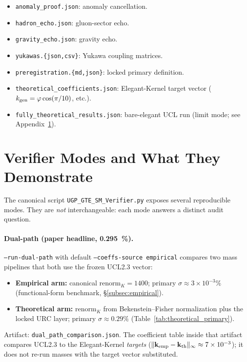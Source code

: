\documentclass[11pt]{article}
\theoremstyle{remark}
\begin{document}
\begin{appendices}
\begin{itemize}[leftmargin=1.2em,itemsep=0.2em]
    \item \texttt{anomaly\_proof.json}: anomaly cancellation.
    \item \texttt{hadron\_echo.json}: gluon-sector echo.
    \item \texttt{gravity\_echo.json}: gravity echo.
    \item \texttt{yukawas.\{json,csv\}}: Yukawa coupling matrices.
    \item \texttt{preregistration.\{md,json\}}: locked primary definition.
    \item \texttt{theoretical\_coefficients.json}: Elegant-Kernel target vector ($k_{\rm gen}=\varphi\cos(\pi/10)$, etc.).
    \item \texttt{fully\_theoretical\_results.json}: bare-elegant UCL run (limit mode; see Appendix~\ref{app:verifier-modes}).
\end{itemize}


\section{Verifier Modes and What They Demonstrate}
\label{app:verifier-modes}

The canonical script \texttt{UGP\_GTE\_SM\_Verifier.py} exposes several reproducible modes.
They are \emph{not} interchangeable: each mode answers a distinct audit question.

\paragraph{Dual-path (paper headline, \SI{0.295}{\percent}).}
\texttt{--run-dual-path} with default \texttt{--coeffs-source empirical} compares two mass pipelines that both use the frozen UCL2.3 vector:
\begin{itemize}[leftmargin=1.2em,itemsep=0.15em]
  \item \textbf{Empirical arm:} canonical $\mathrm{renorm}_K=1400$; primary $\sigma\approx 3\times 10^{-3}\%$ (functional-form benchmark, \S\ref{subsec:empirical}).
  \item \textbf{Theoretical arm:} $\mathrm{renorm}_K$ from Bekenstein--Fisher normalization plus the locked URC layer; primary $\sigma\approx 0.29\%$ (Table~\ref{tab:theoretical_primary}).
\end{itemize}
Artifact: \texttt{dual\_path\_comparison.json}.
The coefficient table inside that artifact compares UCL2.3 to the Elegant-Kernel \emph{targets} ($\|\mathbf{k}_{\rm emp}-\mathbf{k}_{\rm th}\|_\infty\approx 7\times 10^{-3}$); it does not re-run masses with the target vector substituted.


\end{appendices}
\end{document}
